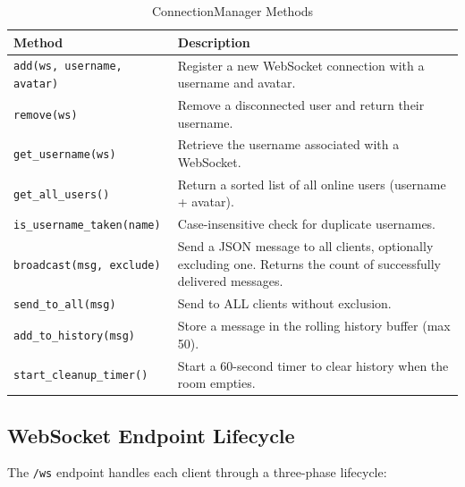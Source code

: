 \documentclass[12pt, a4paper]{article}
\begin{document}
\begin{table}[H]
    \centering
    \caption{ConnectionManager Methods}
    \begin{tabularx}{\textwidth}{l X}
        \toprule
        \textbf{Method} & \textbf{Description} \\
        \midrule
        \texttt{add(ws, username, avatar)}   & Register a new WebSocket connection with a username and avatar. \\
        \texttt{remove(ws)}                   & Remove a disconnected user and return their username. \\
        \texttt{get\_username(ws)}            & Retrieve the username associated with a WebSocket. \\
        \texttt{get\_all\_users()}            & Return a sorted list of all online users (username + avatar). \\
        \texttt{is\_username\_taken(name)}    & Case-insensitive check for duplicate usernames. \\
        \texttt{broadcast(msg, exclude)}      & Send a JSON message to all clients, optionally excluding one. Returns the count of successfully delivered messages. \\
        \texttt{send\_to\_all(msg)}           & Send to ALL clients without exclusion. \\
        \texttt{add\_to\_history(msg)}        & Store a message in the rolling history buffer (max 50). \\
        \texttt{start\_cleanup\_timer()}      & Start a 60-second timer to clear history when the room empties. \\
        \bottomrule
    \end{tabularx}
\end{table}

\subsection{WebSocket Endpoint Lifecycle}

The \texttt{/ws} endpoint handles each client through a three-phase lifecycle:
\end{document}
